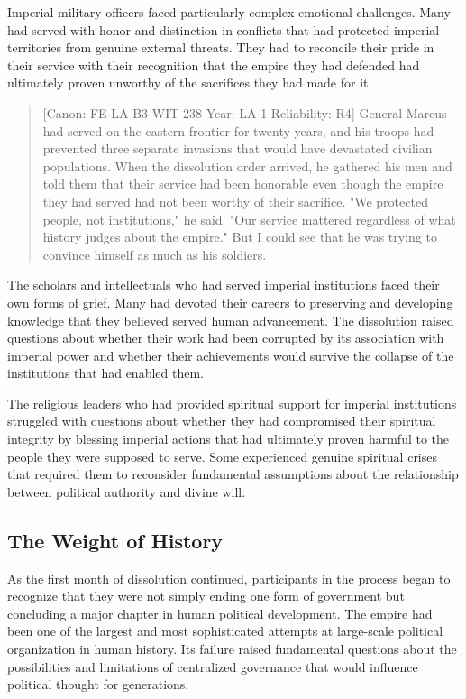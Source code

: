 Imperial military officers faced particularly complex emotional
challenges. Many had served with honor and distinction in conflicts that
had protected imperial territories from genuine external threats. They
had to reconcile their pride in their service with their recognition
that the empire they had defended had ultimately proven unworthy of the
sacrifices they had made for it.

\begin{quote}
{[}Canon: FE-LA-B3-WIT-238 \textbar{} Year: LA 1 \textbar{} Reliability:
R4{]} General Marcus had served on the eastern frontier for twenty
years, and his troops had prevented three separate invasions that would
have devastated civilian populations. When the dissolution order
arrived, he gathered his men and told them that their service had been
honorable even though the empire they had served had not been worthy of
their sacrifice. "We protected people, not institutions," he said. "Our
service mattered regardless of what history judges about the empire."
But I could see that he was trying to convince himself as much as his
soldiers.
\end{quote}

The scholars and intellectuals who had served imperial institutions
faced their own forms of grief. Many had devoted their careers to
preserving and developing knowledge that they believed served human
advancement. The dissolution raised questions about whether their work
had been corrupted by its association with imperial power and whether
their achievements would survive the collapse of the institutions that
had enabled them.

The religious leaders who had provided spiritual support for imperial
institutions struggled with questions about whether they had compromised
their spiritual integrity by blessing imperial actions that had
ultimately proven harmful to the people they were supposed to serve.
Some experienced genuine spiritual crises that required them to
reconsider fundamental assumptions about the relationship between
political authority and divine will.

\subsection{The Weight of History}\label{the-weight-of-history}

As the first month of dissolution continued, participants in the process
began to recognize that they were not simply ending one form of
government but concluding a major chapter in human political
development. The empire had been one of the largest and most
sophisticated attempts at large-scale political organization in human
history. Its failure raised fundamental questions about the
possibilities and limitations of centralized governance that would
influence political thought for generations.

